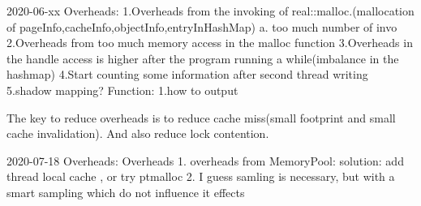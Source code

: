 2020-06-xx
Overheads:
    1.Overheads from the invoking of real::malloc.(mallocation of pageInfo,cacheInfo,objectInfo,entryInHashMap)
        a. too much number of invo
    2.Overheads from too much memory access in the malloc function
    3.Overheads in the handle access is higher after the program running a while(imbalance in the hashmap)
    4.Start counting some information after second thread writing
    5.shadow mapping?
Function:
    1.how to output

The key to reduce overheads is to reduce cache miss(small footprint and small cache invalidation). And also reduce lock contention.


2020-07-18 Overheads:
Overheads
1. overheads from MemoryPool:
    solution: add thread local cache , or try ptmalloc
2. I guess samling is necessary, but with a smart sampling which do not influence it effects